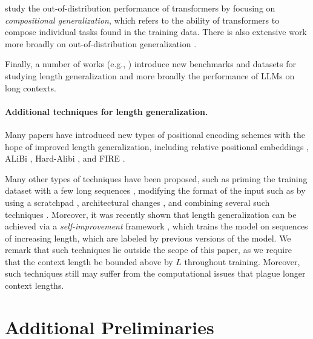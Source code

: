 \documentclass{article}
\begin{document}
\citet{ontanon_making_2022,dziri_faith_2023,hupkes_compositionality_2020} study the out-of-distribution performance of transformers by focusing on \emph{compositional generalization}, which refers to the ability of transformers to compose individual tasks found in the training data. There is also extensive work more broadly on out-of-distribution generalization \cite{nagarajan_understanding_2021,abbe_generalization_2023,kalavasis_transfer_2024}.

Finally, a number of works (e.g., \citet{hupkes_compositionality_2020,liu_exposing_2023,deletang_neural_2023,zhang_unveiling_2023,hsieh_ruler_2024}) introduce new benchmarks and datasets for studying length generalization and more broadly the performance of LLMs on long contexts. 




\paragraph{Additional techniques for length generalization.} Many papers have introduced new types of positional encoding schemes with the hope of improved length generalization, including relative positional embeddings \cite{shaw_self_2018,dai_transformer_2019,huang_improve_2020,ke_rethinking_2021}, ALiBi \cite{press_train_2022}, Hard-Alibi \cite{jelassi_repeat_2024}, and FIRE \cite{li_functional_2024}. 


Many other types of techniques have  been proposed, such as priming the training dataset with a few long sequences \cite{jelassi_length_2023}, %
modifying the format of the input \cite{shen_positional_2023,hu_casebased_2024} such as by using a scratchpad \cite{lanchantin_learning_2023}, architectural changes \cite{csordas_neural_2022,fan_looped_2024}, 
and combining several such techniques \cite{csordas_devil_2022,liu_transformers_2023,zhou_transformers_2024}. Moreover, it was recently shown that length generalization can be achieved via a \emph{self-improvement} framework \cite{lee_selfimproving_2025}, which trains the model on sequences of increasing length, which are labeled by previous versions of the model.  We remark that such techniques lie outside the scope of this paper, as we require that the context length be bounded above by $L$ throughout training. Moreover, such techniques still may suffer from the computational issues that plague longer context lengths. 

\section{Additional Preliminaries}
\end{document}
